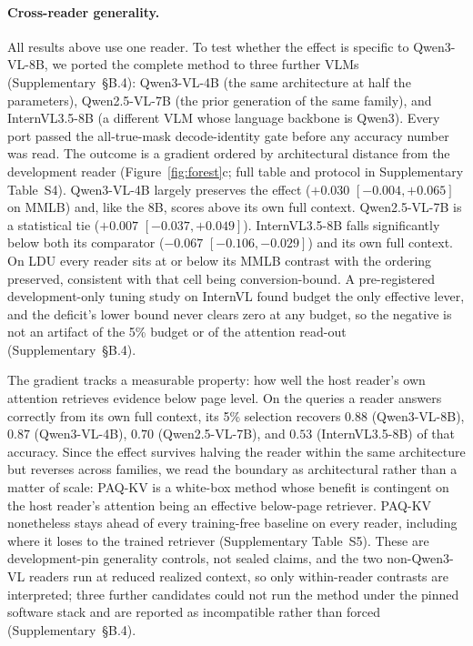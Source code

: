 \documentclass[letterpaper]{article} %
\newcommand{\paqc}{\textsc{PAQ-KV}}
\begin{document}
\paragraph{Cross-reader generality.}\label{sec:results-crossreader}
All results above use one reader. To test whether the effect is specific to
Qwen3-VL-8B, we ported the complete method to three further VLMs
(Supplementary~\S B.4): Qwen3-VL-4B (the same
architecture at half the parameters), Qwen2.5-VL-7B \citep{bai2025qwen25vl}
(the prior generation of the same family), and InternVL3.5-8B
\citep{wang2025internvl35} (a different VLM whose language backbone is
Qwen3). Every port passed the all-true-mask decode-identity gate before any
accuracy number was read. The outcome is a gradient ordered by
architectural distance from the development reader
(Figure~\ref{fig:forest}c; full table and protocol in
Supplementary Table~S4). Qwen3-VL-4B largely preserves the
effect ($+0.030$ $[-0.004,+0.065]$ on MMLB) and, like the 8B,
scores above its own full context. Qwen2.5-VL-7B is a statistical tie
($+0.007$ $[-0.037,+0.049]$). InternVL3.5-8B falls significantly below both
its comparator ($-0.067$ $[-0.106,-0.029]$) and its own full context. On
LDU every reader sits at or below its MMLB contrast with
the ordering preserved, consistent with that cell being conversion-bound. A
pre-registered development-only tuning study on InternVL found budget the
only effective lever, and the deficit's lower bound never clears zero at any
budget, so the negative is not an artifact of the 5\% budget or of the
attention read-out (Supplementary~\S B.4).

The gradient tracks a measurable property: how well the host reader's own
attention retrieves evidence below page level. On the queries a reader
answers correctly from its own full context, its 5\% selection recovers
$0.88$ (Qwen3-VL-8B), $0.87$ (Qwen3-VL-4B), $0.70$ (Qwen2.5-VL-7B), and
$0.53$ (InternVL3.5-8B) of that accuracy. Since the effect survives halving
the reader within the same architecture but reverses across families, we
read the boundary as architectural rather than a matter of scale: \paqc{}
is a white-box method whose benefit is contingent on the host reader's
attention being an effective below-page retriever.
\paqc{} nonetheless stays ahead of every training-free baseline
on every reader, including where it loses to the trained retriever
(Supplementary Table~S5). These are development-pin generality controls, not
sealed claims, and the two non-Qwen3-VL readers run at reduced realized
context, so only within-reader contrasts are interpreted; three further
candidates could not run the method under the pinned software stack and are
reported as incompatible rather than forced (Supplementary~\S B.4).
\end{document}
